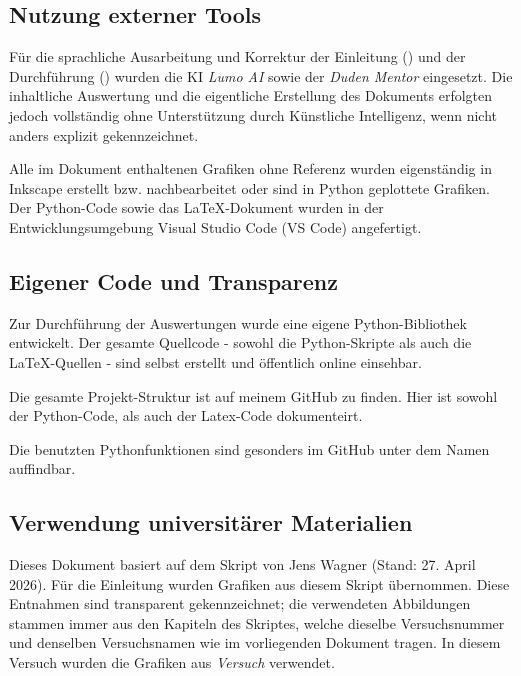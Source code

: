\label{ch:Vorwort}

\subsection*{Nutzung externer Tools}
Für die sprachliche Ausarbeitung und Korrektur der Einleitung () und der Durchführung () wurden die KI \textit{Lumo AI} sowie der \textit{Duden Mentor} eingesetzt. Die inhaltliche Auswertung und die eigentliche Erstellung des Dokuments erfolgten jedoch vollständig ohne Unterstützung durch Künstliche Intelligenz, wenn nicht anders explizit gekennzeichnet. \cite{Duden,Lumo}

Alle im Dokument enthaltenen Grafiken ohne Referenz wurden eigenständig in Inkscape erstellt bzw. nachbearbeitet oder sind in Python geplottete Grafiken. Der Python-Code sowie das LaTeX-Dokument wurden in der Entwicklungsumgebung Visual Studio Code (VS Code) angefertigt.


\subsection*{Eigener Code und Transparenz}
Zur Durchführung der Auswertungen wurde eine eigene Python-Bibliothek entwickelt. Der gesamte Quellcode - sowohl die Python-Skripte als auch die LaTeX-Quellen - sind selbst erstellt und öffentlich online einsehbar.

Die gesamte Projekt-Struktur ist auf meinem GitHub zu finden. Hier ist sowohl der Python-Code, als auch der Latex-Code dokumenteirt. \cite{githubPAP2}

Die benutzten Pythonfunktionen sind gesonders im GitHub unter dem Namen auffindbar. \cite{Papulator}

\subsection*{Verwendung universitärer Materialien}
Dieses Dokument basiert auf dem Skript von Jens Wagner (Stand: 27. April 2026). Für die Einleitung wurden Grafiken aus diesem Skript übernommen. Diese Entnahmen sind transparent gekennzeichnet; die verwendeten Abbildungen stammen immer aus den Kapiteln des Skriptes, welche dieselbe Versuchsnummer und denselben Versuchsnamen wie im vorliegenden Dokument tragen. In diesem Versuch wurden die Grafiken aus \emph{Versuch \versuchsnummer \versuchsname{\versuchsnummer}} verwendet. \cite{skriptPAP21}